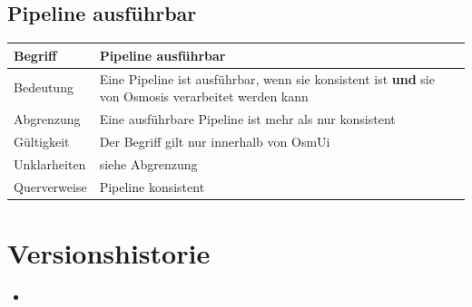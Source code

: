 \documentclass[a4paper,12pt]{scrartcl}
\begin{document}
\begin{center}
\subsection{Pipeline ausführbar}
\begin{tabular}{|p{5cm}|p{10cm}|}
\hline Begriff & \textbf{Pipeline ausführbar} \\ 
\hline Bedeutung & Eine Pipeline ist ausführbar, wenn sie konsistent ist \textbf{und} sie von Osmosis verarbeitet werden kann\\ 
\hline Abgrenzung & Eine ausführbare Pipeline ist mehr als nur konsistent \\ 
\hline Gültigkeit & Der Begriff gilt nur innerhalb von OsmUi \\  
\hline Unklarheiten & siehe Abgrenzung \\ 
\hline Querverweise & Pipeline konsistent \\ 
\hline 
\end{tabular}
\end{center}
\section{Versionshistorie}
\begin{itemize}
\item 
\end{itemize}
\end{document}
